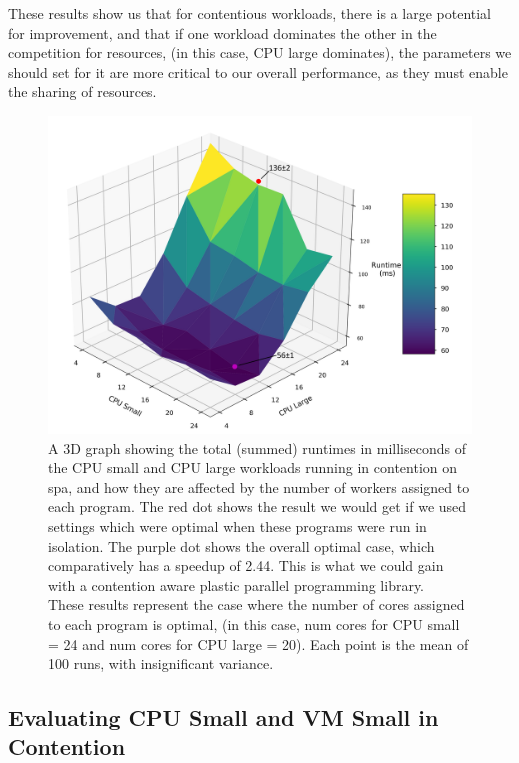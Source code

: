 These results show us that for contentious workloads, there is a large potential for improvement, and that if one workload dominates the other in the competition for resources, (in this case, CPU large dominates), the parameters we should set for it are more critical to our overall performance, as they must enable the sharing of resources.



\begin{figure}[H]
    \includegraphics[width=1\textwidth]{graphics/contention/spa/otwc_cpu_small_and_cpu_large.png}
    \caption{A 3D graph showing the total (summed) runtimes in milliseconds of the CPU small and CPU large workloads running in contention on spa, and how they are affected by the number of workers assigned to each program. The red dot shows the result we would get if we used settings which were optimal when these programs were run in isolation. The purple dot shows the overall optimal case, which comparatively has a speedup of 2.44. This is what we could gain with a contention aware plastic parallel programming library. \\
    These results represent the case where the number of cores assigned to each program is optimal, (in this case, num cores for CPU small = 24 and num cores for CPU large = 20). Each point is the mean of 100 runs, with insignificant variance.}
    \label{fig:con_spa_cpu_small_and_cpu_large}
\end{figure}



\subsection{Evaluating CPU Small and VM Small in Contention}
\label{section:results:evaluating_cpu_small_and_vm_small_in_contention}

